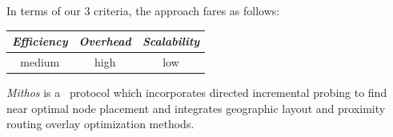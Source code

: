 %
%
%
%
%
%
In terms of our $3$ criteria, the approach fares as follows:
\begin{center}
{\footnotesize
\begin{tabular}{ccc}
\emph{Efficiency} & \emph{Overhead} & \emph{Scalability} \\
\hline
medium &
high &
low
\end{tabular}
}
\end{center}

\emph{Mithos} \cite{WR2003} is a \p\ protocol which incorporates directed
incremental probing to find near optimal node placement and integrates
geographic layout and proximity routing overlay optimization methods.

